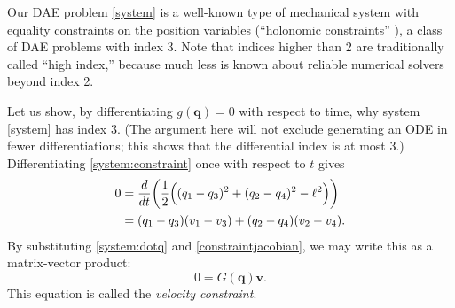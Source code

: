 \documentclass[letterpaper,final,12pt,reqno]{amsart}
\newcommand{\bq}{\mathbf{q}}
\newcommand{\bv}{\mathbf{v}}
\begin{document}
Our DAE problem \eqref{system} is a well-known type of mechanical system with equality constraints on the position variables (``holonomic constraints'' \cite{Lanczos1970}), a class of DAE problems with index 3.  Note that indices higher than 2 are traditionally called ``high index,'' because much less is known about reliable numerical solvers beyond index 2.

Let us show, by differentiating $g(\bq)=0$ with respect to time, why system \eqref{system} has index 3.  (The argument here will not exclude generating an ODE in fewer differentiations; this shows that the differential index is at most 3.)  Differentiating \eqref{system:constraint} once with respect to $t$ gives
\begin{align}
0 &= \frac{d}{dt} \bigg(\frac{1}{2} \Big((q_1 - q_3)^2 + (q_2 - q_4)^2 - \ell^2\Big)\bigg) \notag \\
  &= (q_1 - q_3)(v_1 - v_3) + (q_2 - q_4) (v_2 - v_4). \label{rawvelocityconstraint}
\end{align}
By substituting \eqref{system:dotq} and \eqref{constraintjacobian}, we may write this as a matrix-vector product:
\begin{equation}
0 = G(\bq) \bv. \label{velocityconstraint}
\end{equation}
This equation is called the \emph{velocity constraint}.
\end{document}

